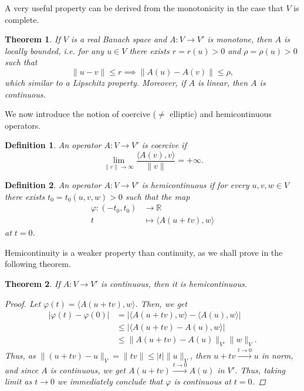 \documentclass{article}
\newtheorem{definition}{Definition}
\newcommand{\R}{\mathbb{R}}
\newtheorem{theorem}{Theorem}
\begin{document}
A very useful property can be derived from the monotonicity in the case that $V$ is complete.
\begin{theorem}
    If $V$ is a real Banach space and $A:V\to V'$ is monotone, then $A$ is locally bounded, i.e. for any $u\in V$ there exists $r=r(u)>0$ and $\rho=\rho(u)>0$ such that
    \begin{equation*}
        \|u-v\|\leq r \implies \|A(u)-A(v)\|\leq \rho,
    \end{equation*}
    which similar to a Lipschitz property. Moreover, if $A$ is linear, then $A$ is continuous.
\end{theorem}
We now introduce the notion of coercive ($\neq$ elliptic) and hemicontinuous operators.
\begin{definition}
    An operator $A:V\to V'$ is coercive if 
    \begin{equation*}
        \lim_{\|v\|\to \infty} \frac{\langle A(v),v\rangle}{\|v\|} = +\infty.
    \end{equation*}
\end{definition}
\begin{definition}
    An operator $A:V\to V'$ is hemicontinuous if for every $u,v,w\in V$ there exists $t_0=t_0(u,v,w)>0$ such that the map 
    \begin{align*}
        \varphi:(-t_0,t_0)&\to \R\\
        t&\mapsto \langle A(u+tv),w\rangle
    \end{align*}
    at $t=0$. 
\end{definition}
Hemicontinuity is a weaker property than continuity, as we shall prove in the following theorem.
\begin{theorem}
    If $A:V\to V'$ is continuous, then it is hemicontinuous.
    \begin{proof}
        Let $\varphi(t)=\langle A(u+tv),w\rangle$. Then, we get
        \begin{align*}
            |\varphi(t)-\varphi(0)| &= |\langle A(u+tv),w\rangle - \langle A(u),w\rangle|\\
            &\leq |\langle A(u+tv)-A(u),w\rangle| \tag{Linearity of $A$}\\
            &\leq \|A(u+tv)-A(u)\|_{V'} \|w\|_V. \tag{Cauchy-Schwarz}
        \end{align*}
        Thus, as $\|(u+tv)-u\|_V=\|tv\|\leq |t|\|u\|_V$, then $u+tv\overset{t\to 0}{\to} u$ in norm, and since $A$ is continuous, we get $A(u+tv)\overset{t\to 0}{\to} A(u)$ in $V'$. Thus, taking limit as $t\to 0$ we immediately conclude that $\varphi$ is continuous at $t=0$.
    \end{proof}
\end{theorem}
\end{document}

